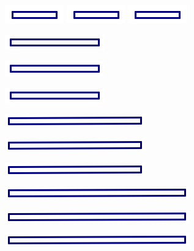 \begin{center}
\includegraphics{1in}
\qquad
\includegraphics{1in}
\qquad
\includegraphics{1in}

\bigskip


\includegraphics{2in}

\includegraphics{2in}

\includegraphics{2in}



\bigskip

\includegraphics{3in}

\includegraphics{3in}

\includegraphics{3in}


\bigskip

\includegraphics{4in}

\includegraphics{4in}

\includegraphics{4in}


\bigskip


\end{center}
